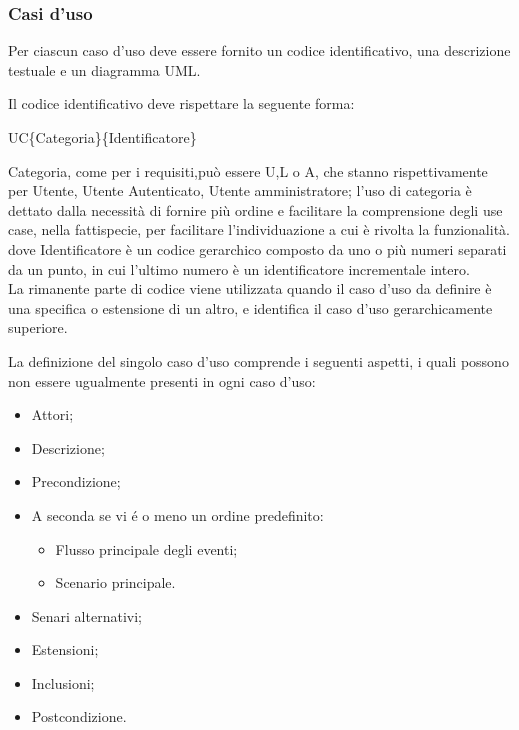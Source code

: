 \subsubsection{Casi d'uso}
Per ciascun caso d'uso deve essere fornito un codice identificativo, una descrizione testuale e un diagramma UML.

\begin{flushleft}
Il codice identificativo deve rispettare la seguente forma:
\end{flushleft}

\begin{center}UC\{Categoria\}\{Identificatore\}\end{center}
Categoria, come per i requisiti,può essere U,L o A, che stanno rispettivamente per Utente, Utente Autenticato, Utente amministratore; l'uso di categoria è dettato dalla necessità di fornire più ordine e facilitare la comprensione degli use case, nella fattispecie, per facilitare l'individuazione a cui è rivolta la funzionalità.
dove Identificatore è un codice gerarchico composto da uno o più numeri separati da un punto, in cui l'ultimo numero è un identificatore incrementale intero.\\
La rimanente parte di codice viene utilizzata quando il caso d'uso da definire è una specifica o estensione di un altro, e identifica il caso d'uso gerarchicamente superiore.

\begin{flushleft}
La definizione del singolo caso d'uso comprende i seguenti aspetti, i quali possono non essere ugualmente presenti in ogni caso d'uso:
\end{flushleft}

\begin{itemize}
\item Attori;
\item Descrizione;
\item Precondizione;
\item A seconda se vi é o meno un ordine predefinito:
\begin{itemize}
\item Flusso principale degli eventi;
\item Scenario principale.
\end{itemize}
\item Senari alternativi;
\item Estensioni;
\item Inclusioni;
\item Postcondizione.
\end{itemize}

